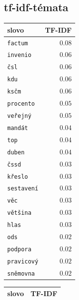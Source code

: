 \documentclass[12pt,a4paper]{report}
\begin{document}
\subsection{tf-idf-témata}



 {


    \begin{tabular}{ |l | r | }
        \hline
        \textbf{slovo} & \textbf{TF-IDF} \\ \hline
        
        \texttt{factum} & $0.08$ \\ \hline
        \texttt{invenio} & $0.06$ \\ \hline
        \texttt{čsl} & $0.06$ \\ \hline
        \texttt{kdu} & $0.06$ \\ \hline
        \texttt{ksčm} & $0.06$ \\ \hline
        \texttt{procento} & $0.05$ \\ \hline
        \texttt{veřejný} & $0.05$ \\ \hline
        \texttt{mandát} & $0.04$ \\ \hline
        \texttt{top} & $0.04$ \\ \hline
        \texttt{duben} & $0.04$ \\ \hline
        \hline
        
        \texttt{čssd} & $0.03$ \\ \hline
        \texttt{křeslo} & $0.03$ \\ \hline
        \texttt{sestavení} & $0.03$ \\ \hline
        \texttt{věc} & $0.03$ \\ \hline
        \texttt{většina} & $0.03$ \\ \hline
        \texttt{hlas} & $0.03$ \\ \hline
        \texttt{ods} & $0.02$ \\ \hline
        \texttt{podpora} & $0.02$ \\ \hline
        \texttt{pravicový} & $0.02$ \\ \hline
        \texttt{sněmovna} & $0.02$ \\ \hline
        
      \end{tabular}

} {

    \begin{tabular}{ |l | r | }
        \hline
        \textbf{slovo} & \textbf{TF-IDF} \\ \hline
        

\end{tabular}}
\end{document}
